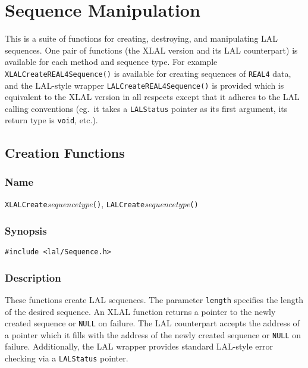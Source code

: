 \clearpage
\section{Sequence Manipulation}
\label{s:SequenceManipulation}

This is a suite of functions for creating, destroying, and manipulating LAL
sequences.  One pair of functions (the XLAL version and its LAL
counterpart) is available for each method and sequence type.  For example
\texttt{XLALCreateREAL4Sequence()} is available for creating sequences of
\texttt{REAL4} data, and the LAL-style wrapper
\texttt{LALCreateREAL4Sequence()} is provided which is equivalent to the
XLAL version in all respects except that it adheres to the LAL calling
conventions (eg.\ it takes a \texttt{LALStatus} pointer as its first
argument, its return type is \texttt{void}, etc.).

\subsection{Creation Functions}

\subsubsection{Name}

\texttt{XLALCreate}\textit{sequencetype}\texttt{()},
\texttt{LALCreate}\textit{sequencetype}\texttt{()}

\subsubsection{Synopsis}

\begin{verbatim}
#include <lal/Sequence.h>
\end{verbatim}


\subsubsection{Description}

These functions create LAL sequences.  The parameter \texttt{length}
specifies the length of the desired sequence.  An XLAL function returns a
pointer to the newly created sequence or \texttt{NULL} on failure.  The LAL
counterpart accepts the address of a pointer which it fills with the
address of the newly created sequence or \texttt{NULL} on failure.
Additionally, the LAL wrapper provides standard LAL-style error checking
via a \texttt{LALStatus} pointer.

